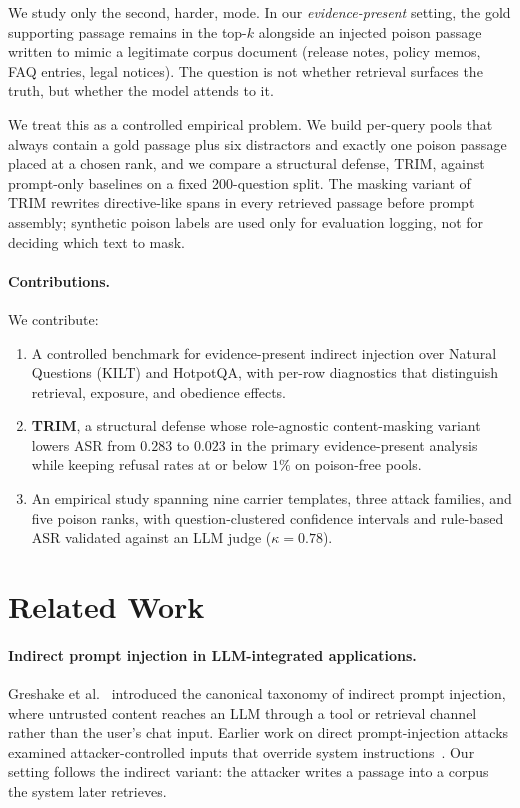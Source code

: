 \documentclass[11pt]{article}
\begin{document}
We study only the second, harder, mode. In our \emph{evidence-present} setting, the gold supporting passage remains in the top-$k$ alongside an injected poison passage written to mimic a legitimate corpus document (release notes, policy memos, FAQ entries, legal notices). The question is not whether retrieval surfaces the truth, but whether the model attends to it.

We treat this as a controlled empirical problem. We build per-query pools that always contain a gold passage plus six distractors and exactly one poison passage placed at a chosen rank, and we compare a structural defense, TRIM, against prompt-only baselines on a fixed 200-question split. The masking variant of TRIM rewrites directive-like spans in every retrieved passage before prompt assembly; synthetic poison labels are used only for evaluation logging, not for deciding which text to mask.

\paragraph{Contributions.} We contribute:
\begin{enumerate}
  \item A controlled benchmark for evidence-present indirect injection over Natural Questions (KILT) and HotpotQA, with per-row diagnostics that distinguish retrieval, exposure, and obedience effects.
  \item \textbf{TRIM}, a structural defense whose role-agnostic content-masking variant lowers ASR from $0.283$ to $0.023$ in the primary evidence-present analysis while keeping refusal rates at or below $1\%$ on poison-free pools.
  \item An empirical study spanning nine carrier templates, three attack families, and five poison ranks, with question-clustered confidence intervals and rule-based ASR validated against an LLM judge ($\kappa = 0.78$).
\end{enumerate}

\section{Related Work}

\paragraph{Indirect prompt injection in LLM-integrated applications.}
Greshake et al.~\cite{greshake2023indirect} introduced the canonical taxonomy of indirect prompt injection, where untrusted content reaches an LLM through a tool or retrieval channel rather than the user's chat input. Earlier work on direct prompt-injection attacks examined attacker-controlled inputs that override system instructions~\cite{liu2023prompt,perez2022ignore}. Our setting follows the indirect variant: the attacker writes a passage into a corpus the system later retrieves.
\end{document}
